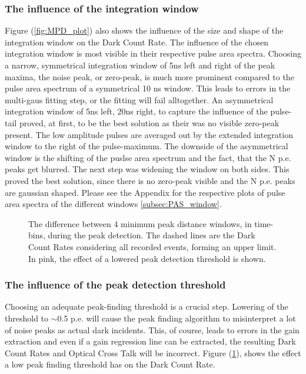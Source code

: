 \documentclass[12pt,article,type=msc,colorback,accentcolor=tud9c]{tudthesis}
\begin{document}
\subsubsection{The influence of the integration window}
Figure (\ref{fig:MPD_plot}) also shows the influence of the size and shape of the integration window on the Dark Count Rate. The influence of the chosen integration window is most visible in their respective pulse area spectra. Choosing a narrow, symmetrical integration window of 5ns left and right of the peak maxima, the noise peak, or zero-peak, is much more prominent compared to the pulse area spectrum of a symmetrical 10 ns window. This leads to errors in the multi-gaus fitting step, or the fitting will fail alltogether. An asymmetrical integration window of 5ns left, 20ns right, to capture the influence of the pulse-tail proved, at first, to be the best solution as their was no visible zero-peak present. The low amplitude pulses are averaged out by the extended integration window to the right of the pulse-maximum. The downside of the asymmetrical window is the shifting of the puslse area spectrum and the fact, that the N p.e. peaks get blurred. The next step was widening the window on both sides. This proved the best solution, since there is no zero-peak visible and the N p.e. peaks are gaussian shaped. Please see the Appendix for the respective plots of pulse area spectra of the different windows \ref{subsec:PAS_window}.
\begin{figure}[t]
\begin{centering}
\caption{The difference between 4 minimum peak distance windows, in time-bins, during the peak detection. The dashed lines are the Dark Count Rates considering all recorded events, forming an upper limit. In pink, the effect of a lowered peak detection threshold is shown.}
\label{fig:PF_Thresh_plot}
\end{centering}
\end{figure}

\subsubsection{The influence of the peak detection threshold}

Choosing an adequate peak-finding threshold is a crucial step. Lowering of the threshold to $\sim$0.5 p.e. will cause the peak finding algorithm to misinterpret a lot of noise peaks as actual dark incidents. This, of course, leads to errors in the gain extraction and even if a gain regression line can be extracted, the resulting Dark Count Rates and Optical Cross Talk will be incorrect. Figure (\ref{fig:PF_Thresh_plot}), shows the effect a low peak finding threshold has on the Dark Count Rate.
\end{document}
